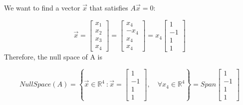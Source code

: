 \documentclass{article}
\newcommand{\R}{\mathbb{R}}
\begin{document}
\begin{enumerate}
    
    
    We want to find a vector $\vec{x}$ that satisfies $A\vec{x}=0:$
    
    \begin{equation*}
        \vec{x} = \left[
                    \begin{array}{r}
                        x_1\\
                        x_2\\
                        x_3\\
                        x_4
                    \end{array}
                  \right]
                = \left[
                    \begin{array}{r}
                        x_4\\
                        -x_4\\
                        x_4\\
                        x_4
                    \end{array}
                  \right]
                = x_4 \left[
                        \begin{array}{r}
                            1\\
                            -1\\
                            1\\
                            1
                        \end{array}
                      \right]
    \end{equation*}
    Therefore, the null space of A is
    
    \begin{equation*}
        NullSpace\left(A\right) = \left\{ \vec{x} \in \R^4 \ : \vec{x} = \left[
            \begin{array}{r}
                1\\
                -1\\
                1\\
                1
            \end{array}
        \right], \quad \forall x_4 \in \R^4 
        \right\} = Span\left[
                            \begin{array}{r}
                                1\\
                                -1\\
                                1\\
                                1
                            \end{array}
                        \right]
    \end{equation*}
    

\end{enumerate}
\end{document}
